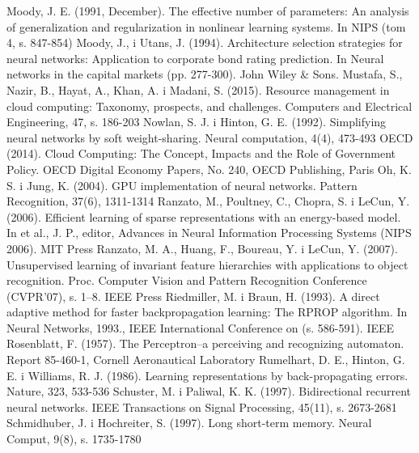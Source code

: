 \documentclass[12pt,a4paper,twoside]{article}
\begin{document}
\begin{thebibliography}{99}
 Moody, J. E. (1991, December). The effective number of parameters: An analysis of generalization and regularization in nonlinear learning systems. In NIPS (tom 4, s. 847-854)
 Moody, J., i Utans, J. (1994). Architecture selection strategies for neural networks: Application to corporate bond rating prediction. In Neural networks in the capital markets (pp. 277-300). John Wiley \& Sons.
 Mustafa, S., Nazir, B., Hayat, A., Khan, A. i Madani, S. (2015). Resource management in cloud computing: Taxonomy, prospects, and challenges. Computers and Electrical Engineering, 47, s. 186-203
 Nowlan, S. J. i Hinton, G. E. (1992). Simplifying neural networks by soft weight-sharing. Neural computation, 4(4), 473-493
 OECD (2014). Cloud Computing: The Concept, Impacts and the Role of Government Policy. OECD Digital Economy Papers, No. 240, OECD Publishing, Paris
 Oh, K. S. i Jung, K. (2004). GPU implementation of neural networks. Pattern Recognition, 37(6), 1311-1314
 Ranzato, M., Poultney, C., Chopra, S. i LeCun, Y. (2006). Efficient learning of sparse representations with an energy-based model. In et al., J. P., editor, Advances in Neural Information Processing Systems (NIPS 2006). MIT Press
 Ranzato, M. A., Huang, F., Boureau, Y. i LeCun, Y. (2007). Unsupervised learning of invariant feature hierarchies with applications to object recognition. Proc. Computer Vision and Pattern Recognition Conference (CVPR’07), s. 1–8. IEEE Press
 Riedmiller, M. i Braun, H. (1993). A direct adaptive method for faster backpropagation learning: The RPROP algorithm. In Neural Networks, 1993., IEEE International Conference on (s. 586-591). IEEE
 Rosenblatt, F. (1957). The Perceptron--a perceiving and recognizing automaton. Report 85-460-1, Cornell Aeronautical Laboratory
 Rumelhart, D. E., Hinton, G. E. i Williams, R. J. (1986). Learning representations by back-propagating errors. Nature, 323, 533-536
 Schuster, M. i Paliwal, K. K. (1997). Bidirectional recurrent neural networks. IEEE Transactions on Signal Processing, 45(11), s. 2673-2681
 Schmidhuber, J. i Hochreiter, S. (1997). Long short-term memory. Neural Comput, 9(8), s. 1735-1780

\end{thebibliography}
\end{document}
